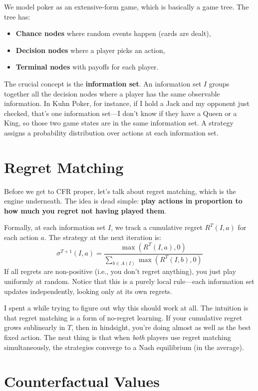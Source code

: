 \documentclass[11pt]{article}
\begin{document}
We model poker as an extensive-form game, which is basically a game tree. The tree has:
\begin{itemize}
    \item \textbf{Chance nodes} where random events happen (cards are dealt),
    \item \textbf{Decision nodes} where a player picks an action,
    \item \textbf{Terminal nodes} with payoffs for each player.
\end{itemize}

The crucial concept is the \textbf{information set}. An information set $I$ groups together all the decision nodes where a player has the same observable information. In Kuhn Poker, for instance, if I hold a Jack and my opponent just checked, that's one information set---I don't know if they have a Queen or a King, so those two game states are in the same information set. A strategy assigns a probability distribution over actions at each information set.

\section{Regret Matching}

Before we get to CFR proper, let's talk about regret matching, which is the engine underneath. The idea is dead simple: \textbf{play actions in proportion to how much you regret not having played them}.

Formally, at each information set $I$, we track a cumulative regret $R^T(I, a)$ for each action $a$. The strategy at the next iteration is:
\begin{equation}
    \sigma^{T+1}(I, a) = \frac{\max(R^T(I, a), 0)}{\sum_{b \in A(I)} \max(R^T(I, b), 0)}
\end{equation}
If all regrets are non-positive (i.e., you don't regret anything), you just play uniformly at random. Notice that this is a purely local rule---each information set updates independently, looking only at its own regrets.

I spent a while trying to figure out why this should work at all. The intuition is that regret matching is a form of no-regret learning. If your cumulative regret grows sublinearly in $T$, then in hindsight, you're doing almost as well as the best fixed action. The neat thing is that when \textit{both} players use regret matching simultaneously, the strategies converge to a Nash equilibrium (in the average).

\section{Counterfactual Values}
\end{document}
